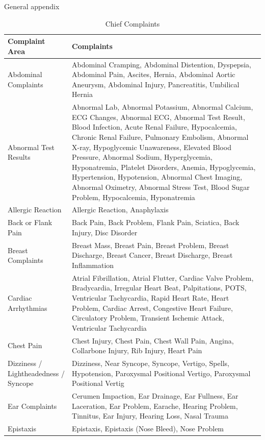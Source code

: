 \documentclass[,,nonblindrev]{informs}
\begin{document}
\begin{APPENDIX}{General appendix}

\begin{longtable}{|p{5cm}|p{12cm}|}
\caption{Chief Complaints} \\
\hline
\textbf{Complaint Area} & \textbf{Complaints} \\
\hline
Abdominal Complaints & Abdominal Cramping, Abdominal Distention, Dyspepsia, Abdominal Pain, Ascites, Hernia, Abdominal Aortic Aneurysm, Abdominal Injury, Pancreatitis, Umbilical Hernia \\
\hline
Abnormal Test Results & Abnormal Lab, Abnormal Potassium, Abnormal Calcium, ECG Changes, Abnormal ECG, Abnormal Test Result, Blood Infection, Acute Renal Failure, Hypocalcemia, Chronic Renal Failure, Pulmonary Embolism, Abnormal X-ray, Hypoglycemic Unawareness, Elevated Blood Pressure, Abnormal Sodium, Hyperglycemia, Hyponatremia, Platelet Disorders, Anemia, Hypoglycemia, Hypertension, Hypotension, Abnormal Chest Imaging, Abnormal Oximetry, Abnormal Stress Test, Blood Sugar Problem, Hypocalcemia, Hyponatremia \\
\hline
Allergic Reaction & Allergic Reaction, Anaphylaxis \\
\hline
Back or Flank Pain & Back Pain, Back Problem, Flank Pain, Sciatica, Back Injury, Disc Disorder \\
\hline
Breast Complaints & Breast Mass, Breast Pain, Breast Problem, Breast Discharge, Breast Cancer, Breast Discharge, Breast Inflammation \\
\hline
Cardiac Arrhythmias & Atrial Fibrillation, Atrial Flutter, Cardiac Valve Problem, Bradycardia, Irregular Heart Beat, Palpitations, POTS, Ventricular Tachycardia, Rapid Heart Rate, Heart Problem, Cardiac Arrest, Congestive Heart Failure, Circulatory Problem, Transient Ischemic Attack, Ventricular Tachycardia \\
\hline
Chest Pain & Chest Injury, Chest Pain, Chest Wall Pain, Angina, Collarbone Injury, Rib Injury, Heart Pain \\
\hline
Dizziness / Lightheadedness / Syncope & Dizziness, Near Syncope, Syncope, Vertigo, Spells, Hypotension, Paroxysmal Positional Vertigo, Paroxysmal Positional Vertig \\
\hline
Ear Complaints & Cerumen Impaction, Ear Drainage, Ear Fullness, Ear Laceration, Ear Problem, Earache, Hearing Problem, Tinnitus, Ear Injury, Hearing Loss, Nasal Trauma \\
\hline
Epistaxis & Epistaxis, Epistaxis (Nose Bleed), Nose Problem \\

\end{longtable}
\end{APPENDIX}
\end{document}
